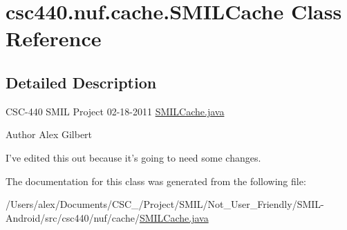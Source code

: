 \hypertarget{classcsc440_1_1nuf_1_1cache_1_1_s_m_i_l_cache}{\section{csc440.\-nuf.\-cache.\-S\-M\-I\-L\-Cache Class Reference}
\label{classcsc440_1_1nuf_1_1cache_1_1_s_m_i_l_cache}
}


\subsection{Detailed Description}
C\-S\-C-\/440 S\-M\-I\-L Project 02-\/18-\/2011 \hyperlink{_s_m_i_l_cache_8java}{S\-M\-I\-L\-Cache.\-java} \begin{DoxyAuthor}{Author}
Alex Gilbert
\end{DoxyAuthor}
I've edited this out because it's going to need some changes. 

The documentation for this class was generated from the following file\-:\begin{DoxyCompactItemize}
\item 
/\-Users/alex/\-Documents/\-C\-S\-C\-\_/\-Project/\-S\-M\-I\-L/\-Not\-\_\-\-User\-\_\-\-Friendly/\-S\-M\-I\-L-\/\-Android/src/csc440/nuf/cache/\hyperlink{_s_m_i_l_cache_8java}{S\-M\-I\-L\-Cache.\-java}\end{DoxyCompactItemize}
